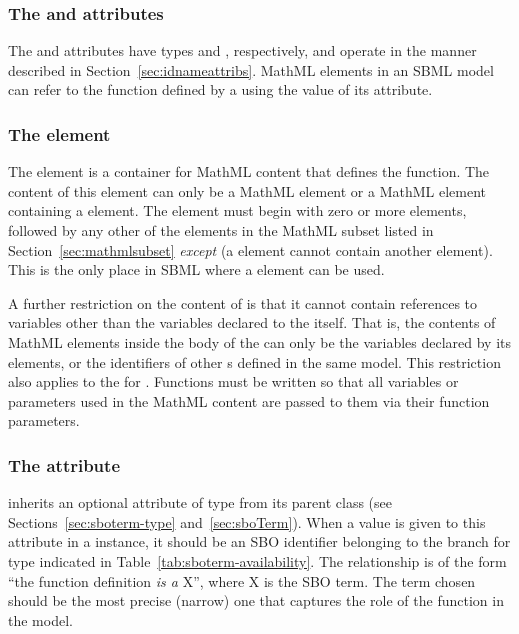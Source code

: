 \subsubsection{The  and  attributes}

The  and  attributes have types 
and , respectively, and operate in the manner
described in Section~\ref{sec:idnameattribs}.  MathML 
elements in an SBML model can refer to the function defined by a
\FunctionDefinition using the value of its  attribute.


\subsubsection{The  element}
\label{sec:function-definition-math}



The  element is a container for MathML
content that defines the function.  The content of this
element can only be a MathML  element
or a MathML  element containing a
   element.  The  element must begin
with zero or more  elements, followed by any other of
the elements in the MathML subset listed in
Section~\ref{sec:mathmlsubset} \emph{except}  (\ie a
 element cannot contain another 
element).  This is the only place in SBML where a 
element can be used.



A further restriction on the content of  is that it
cannot contain references to variables other than the variables
declared to the  itself.  That is, the contents of
MathML  elements inside the body of the 
can only be the variables declared by its  elements,
or the identifiers of other \FunctionDefinition{}s defined in
the same model.  This restriction also applies to the
   for .  Functions must be written
so that all variables or parameters used in the MathML content are
passed to them via their function parameters.


\subsubsection{The  attribute}
\label{sec:functiondefinition-sboterm}

\FunctionDefinition inherits an optional 
attribute of type  from its parent
class \SBase (see Sections~\ref{sec:sboterm-type}
and~\ref{sec:sboTerm}).  When a value is given to this
attribute in a \FunctionDefinition instance, it should be an
SBO identifier belonging to the branch for type \FunctionDefinition 
indicated in Table~\ref{tab:sboterm-availability}.  The relationship is
of the form ``the function definition \emph{is a} X'', where X is
the SBO term.  The term chosen should be the most precise (narrow)
one that captures the role of the function in the model.

